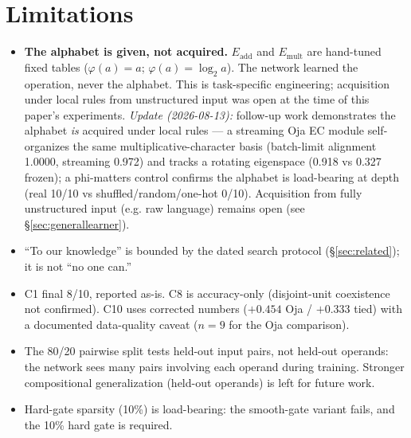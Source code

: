 \documentclass[11pt]{article}
\begin{document}
\section{Limitations}\label{sec:limitations}
\begin{itemize}
\item \textbf{The alphabet is given, not acquired.} $E_{\mathrm{add}}$ and $E_{\mathrm{mult}}$ are hand-tuned fixed tables ($\varphi(a)=a$; $\varphi(a)=\log_2 a$). The network learned the operation, never the alphabet. This is task-specific engineering; acquisition under local rules from unstructured input was open at the time of this paper's experiments. \emph{Update (2026-08-13):} follow-up work demonstrates the alphabet \emph{is} acquired under local rules — a streaming Oja EC module self-organizes the same multiplicative-character basis (batch-limit alignment 1.0000, streaming 0.972) and tracks a rotating eigenspace (0.918 vs 0.327 frozen); a phi-matters control confirms the alphabet is load-bearing at depth (real 10/10 vs shuffled/random/one-hot 0/10). Acquisition from fully unstructured input (e.g. raw language) remains open (see \S\ref{sec:generallearner}).
\item ``To our knowledge'' is bounded by the dated search protocol (\S\ref{sec:related}); it is not ``no one can.''
\item C1 final 8/10, reported as-is. C8 is accuracy-only (disjoint-unit coexistence not confirmed). C10 uses corrected numbers ($+0.454$ Oja / $+0.333$ tied) with a documented data-quality caveat ($n=9$ for the Oja comparison).
\item The 80/20 pairwise split tests held-out input pairs, not held-out operands: the network sees many pairs involving each operand during training. Stronger compositional generalization (held-out operands) is left for future work.
\item Hard-gate sparsity (10\%) is load-bearing: the smooth-gate variant fails, and the 10\% hard gate is required.

\end{itemize}
\end{document}
